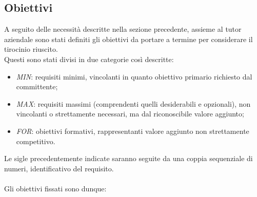 \subsection{Obiettivi}
A seguito delle necessità descritte nella sezione precedente, assieme al tutor aziendale sono stati definiti gli obiettivi da portare a termine per considerare il tirocinio riuscito. \\
Questi sono stati divisi in due categorie così descritte:
\begin{itemize}
	\item \textit{MIN}: requisiti minimi, vincolanti in quanto obiettivo primario richiesto dal committente;
	\item \textit{MAX}: requisiti massimi (comprendenti quelli desiderabili e opzionali), non vincolanti o strettamente necessari, ma dal riconoscibile valore aggiunto;
	\item \textit{FOR}: obiettivi formativi, rappresentanti valore aggiunto non strettamente competitivo.
\end{itemize}
Le sigle precedentemente indicate saranno seguite da una coppia sequenziale di numeri, identificativo del requisito.\\\\
Gli obiettivi fissati sono dunque:
